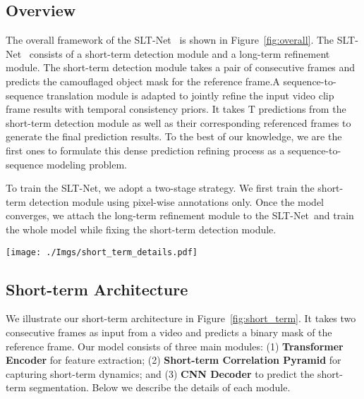 \documentclass[10pt,twocolumn,letterpaper]{article}
\def\Ourmodel{SLT-Net}
\def\figref#1{Figure~\ref{#1}}
\begin{document}
\subsection{Overview}
The overall framework of the \Ourmodel~ is shown in \figref{fig:overall}. The \Ourmodel~ consists of a short-term detection module and a long-term refinement module. The short-term detection module takes a pair of consecutive frames and predicts the camouflaged object mask for the reference frame.A sequence-to-sequence translation module is adapted to jointly refine the input video clip frame results with temporal consistency priors. It takes $\mathrm{T}$ predictions from the short-term detection module as well as their corresponding referenced frames to generate the final prediction results. To the best of our knowledge, we are the first ones to formulate this dense prediction refining process as a sequence-to-sequence modeling problem.

To train the \Ourmodel, we adopt a two-stage strategy. 
We first train the short-term detection module using pixel-wise annotations only. Once the model converges, we attach the long-term refinement module to the \Ourmodel~and train the whole model while fixing the short-term detection module. 

\begin{figure*}[t!]
\begin{center}
\texttt{[image: ./Imgs/short\_term\_details.pdf]}
\end{center}
\vspace{-20pt}
\caption{\small
The overview of our short-term pipeline. The network first extracts features from the input frames by a transformer encoder, then computes a full-range volumetric correspondence between the reference frame $\mathbf{I}_{t}$ and its neighboring frame $\mathbf{I}_{t+1}$ to form a correlation volume pyramid. A  CNN decoder is used to predict the final prediction from the motions captured by the short-term correlation pyramid.}
\vspace{-2mm}
\label{fig:short_term}
\end{figure*}

\subsection{Short-term Architecture}
We illustrate our short-term architecture in \figref{fig:short_term}.
It takes two consecutive frames as input from a video and predicts a binary mask of the reference frame. Our model consists of three main modules: (1) \textbf{Transformer Encoder} for feature extraction; (2) \textbf{Short-term Correlation Pyramid} for capturing short-term dynamics; and (3) \textbf{CNN Decoder} to predict the short-term segmentation. Below we describe the details of each module. 
\end{document}
